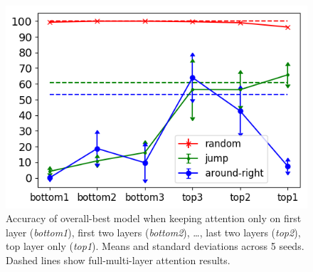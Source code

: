 \begin{figure}[tb]
    \centering
    \includegraphics[width=.5\textwidth,keepaspectratio]{figures/attention_exp.png}
    \caption{Accuracy of overall-best model when keeping attention
      only on first layer (\emph{bottom1}), first two layers
      (\emph{bottom2}), \ldots, last two layers (\emph{top2}), top
      layer only (\emph{top1}). Means and standard deviations across 5
      seeds. Dashed lines show full-multi-layer attention results.}
    \label{fig:exp3}
\end{figure}

